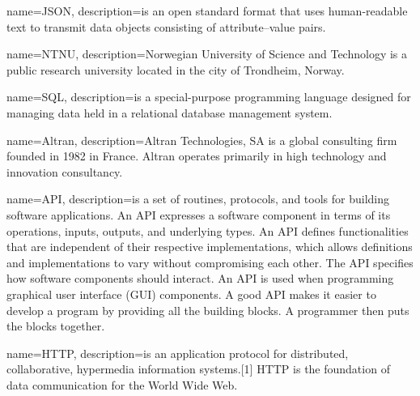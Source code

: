 \documentclass[../document]{subfiles}
\begin{document}
 {
   name=JSON,
   description={is an open standard format that uses human-readable text to transmit data objects consisting of attribute–value pairs.}
}

{
   name=NTNU,
   description={Norwegian University of Science and Technology is a public research university located in the city of Trondheim, Norway.}
}

{
   name=SQL,
   description={is a special-purpose programming language designed for managing data held in a relational database management system.}
}

{
   name=Altran,
   description={Altran Technologies, SA is a global consulting firm founded in 1982 in France. Altran operates primarily in high technology and innovation consultancy.}
}

{
   name=API,
   description={is a set of routines, protocols, and tools for building software applications. An API expresses a software component in terms of its operations, inputs, outputs, and underlying types. An API defines functionalities that are independent of their respective implementations, which allows definitions and implementations to vary without compromising each other. The API specifies how software components should interact. An API is used when programming graphical user interface (GUI) components. A good API makes it easier to develop a program by providing all the building blocks. A programmer then puts the blocks together.}
}

{
   name=HTTP,
   description={is an application protocol for distributed, collaborative, hypermedia information systems.[1] HTTP is the foundation of data communication for the World Wide Web.}
}
\end{document}

